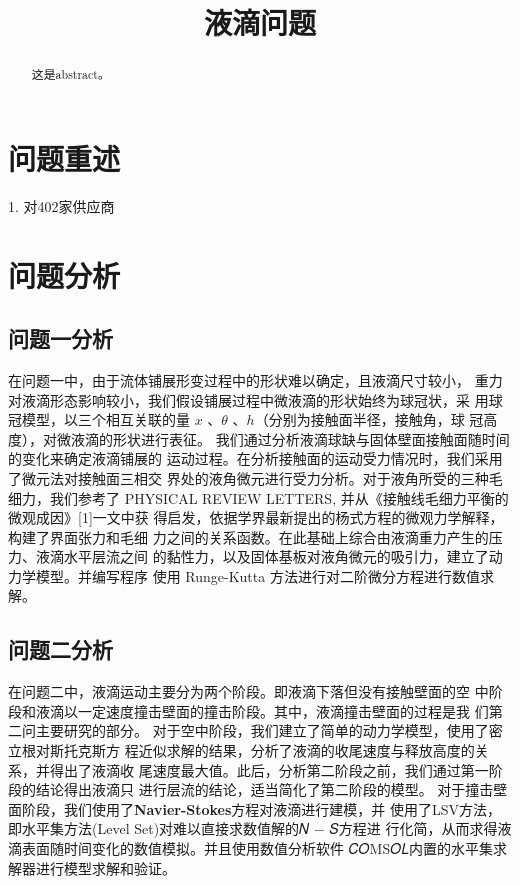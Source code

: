 \documentclass{cumcmthesis}
\title{液滴问题}\tihao{A}
\begin{document}
\maketitle

\begin{abstract}
    这是abstract。

\end{abstract}

\section{问题重述}

1. 对402家供应商

\section{问题分析}
\subsection{问题一分析}
在问题一中，由于流体铺展形变过程中的形状难以确定，且液滴尺寸较小，
重力对液滴形态影响较小，我们假设铺展过程中微液滴的形状始终为球冠状，采
用球冠模型，以三个相互关联的量 $x$ 、$\theta$ 、$h$（分别为接触面半径，接触角，球
冠高度），对微液滴的形状进行表征。
我们通过分析液滴球缺与固体壁面接触面随时间的变化来确定液滴铺展的
运动过程。在分析接触面的运动受力情况时，我们采用了微元法对接触面三相交
界处的液角微元进行受力分析。对于液角所受的三种毛细力，我们参考了
PHYSICAL REVIEW LETTERS, 并从《接触线毛细力平衡的微观成因》[1]一文中获
得启发，依据学界最新提出的杨式方程的微观力学解释，构建了界面张力和毛细
力之间的关系函数。在此基础上综合由液滴重力产生的压力、液滴水平层流之间
的黏性力，以及固体基板对液角微元的吸引力，建立了动力学模型。并编写程序
使用 Runge-Kutta 方法进行对二阶微分方程进行数值求解。
\subsection{问题二分析}
在问题二中，液滴运动主要分为两个阶段。即液滴下落但没有接触壁面的空
中阶段和液滴以一定速度撞击壁面的撞击阶段。其中，液滴撞击壁面的过程是我
们第二问主要研究的部分。
对于空中阶段，我们建立了简单的动力学模型，使用了密立根对斯托克斯方
程近似求解的结果，分析了液滴的收尾速度与释放高度的关系，并得出了液滴收
尾速度最大值。此后，分析第二阶段之前，我们通过第一阶段的结论得出液滴只
进行层流的结论，适当简化了第二阶段的模型。
对于撞击壁面阶段，我们使用了\textbf{Navier-Stokes}方程对液滴进行建模，并
使用了LSV方法，即水平集方法(Level Set)对难以直接求数值解的𝑁 − 𝑆方程进
行化简，从而求得液滴表面随时间变化的数值模拟。并且使用数值分析软件
𝐶𝑂MS𝑂𝐿内置的水平集求解器进行模型求解和验证。
\end{document}
